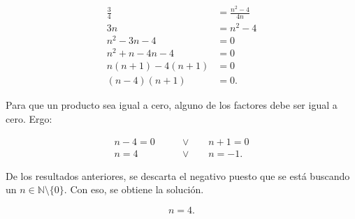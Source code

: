 \documentclass{fmbvecto}
\begin{document}
\begin{problema}
\begin{align*}
    \frac{3}{4} &= \frac{n^2-4}{4n} \\
    3n &= n^2-4 \\
    n^2-3n-4 &= 0 \\
    n^2+n-4n-4 &= 0 \\
    n(n+1)-4(n+1) &= 0 \\
    (n-4)(n+1) &= 0.
\end{align*}

Para que un producto sea igual a cero, alguno de los factores debe ser igual a cero. Ergo:

\begin{align*}
    n-4 = 0 \qquad &\lor \qquad n+1 = 0 \\
    n = 4 \qquad &\lor \qquad n = -1.
\end{align*}

De los resultados anteriores, se descarta el negativo puesto que se está buscando un \(n \in \mathbb{N} \setminus \{0\}\). Con eso, se obtiene la solución.
\begin{gbox}
    \[n = 4.\]
\end{gbox}

\end{problema}

\phantom{} %
\end{document}
